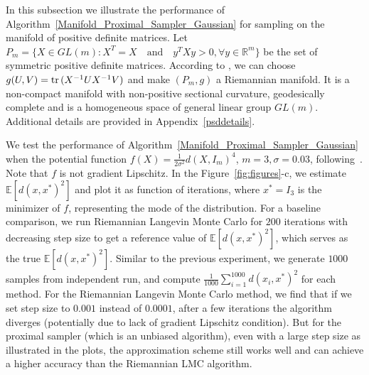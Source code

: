 In this subsection we illustrate the performance of Algorithm~\ref{Manifold_Proximal_Sampler_Gaussian}  for sampling on the manifold of positive definite matrices.
Let $P_{m} = \{ X \in GL(m): X^{T} = X \quad\text{and} \quad y^{T} X y > 0, \forall y \in \mathbb{R}^{m} \}$
be the set of symmetric positive definite matrices. 
According to \citet[Section 6.2]{bharath2023sampling}, we can choose $g(U, V) = \operatorname{tr\,}(X^{-1}UX^{-1}V)$ 
and make $(P_{m}, g)$ a Riemannian manifold. 
It is a non-compact manifold with non-positive sectional curvature, geodesically complete 
and is a homogeneous space of general linear group $GL(m)$. Additional details are provided in Appendix~\ref{psddetails}.

We test the performance of Algorithm~\ref{Manifold_Proximal_Sampler_Gaussian} when the potential function $f(X) = \frac{1}{2\sigma^{2}} d(X, I_{m})^{4}$, $m = 3, \sigma = 0.03$, following~\cite{bharath2023sampling}. Note that $f$ is not gradient Lipschitz. In the Figure~\ref{fig:figures}-c, we estimate $\mathbb{E}[d(x, x^{*})^{2}]$ and plot it as function of iterations, 
where $x^{*} = I_{3}$ is the minimizer of $f$, representing the mode of the distribution. For a baseline comparison, we run Riemannian Langevin Monte Carlo for $200$ iterations with decreasing step size to get a reference value of $\mathbb{E}[d(x, x^{*})^{2}]$, which serves as the true $\mathbb{E}[d(x, x^{*})^{2}]$. Similar to the previous experiment, we generate $1000$ samples from independent run, and compute $\frac{1}{1000}\sum_{i = 1}^{1000} d(x_{i}, x^{*})^{2}$ for each method. For the Riemannian Langevin Monte Carlo method, we find that if we set step size to $0.001$ instead of $0.0001$, after a few iterations the algorithm diverges (potentially due to lack of gradient Lipschitz condition). But for the proximal sampler (which is an unbiased algorithm), even with a large step size as illustrated in the plots, 
the approximation scheme still works well and can achieve a higher accuracy than the Riemannian LMC algorithm. 








